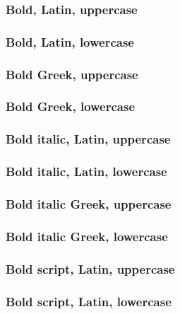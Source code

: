 \documentclass[final]{article}
\newcounter{#1}
\begin{document}
\subsubsection{Bold, Latin, uppercase}

\subsubsection{Bold, Latin, lowercase}

\subsubsection{Bold Greek, uppercase}

\subsubsection{Bold Greek, lowercase}

\subsubsection{Bold italic, Latin, uppercase}

\subsubsection{Bold italic, Latin, lowercase}

\subsubsection{Bold italic Greek, uppercase}

\subsubsection{Bold italic Greek, lowercase}

\subsubsection{Bold script, Latin, uppercase}

\subsubsection{Bold script, Latin, lowercase}
\end{document}
